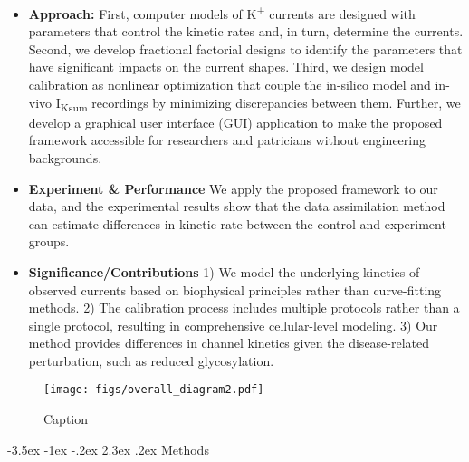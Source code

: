 \documentclass[11pt]{article}
\makeatletter
\renewcommand\section{\@startsection {section}{1}{\z@}%
                                   {-3.5ex \@plus -1ex \@minus -.2ex}%
                                   {2.3ex \@plus.2ex}%
                                   {\normalfont\fontfamily{phv}\fontsize{16}{19}\bfseries}}
\makeatother
\begin{document}
\begin{itemize}
    \item \textbf{Approach:} First, computer models of K\textsuperscript{+} currents are designed with parameters that control the kinetic rates and, in turn, determine the currents. Second, we develop fractional factorial designs to identify the parameters that have significant impacts on the current shapes. Third, we design model calibration as nonlinear optimization that couple the in-silico model and in-vivo I\textsubscript{Ksum} recordings by minimizing discrepancies between them. Further, we develop a graphical user interface (GUI) application to make the proposed framework accessible for researchers and patricians without engineering backgrounds.
    \item \textbf{Experiment \& Performance} We apply the proposed framework to our data, and the experimental results show that the data assimilation method can estimate differences in kinetic rate between the control and experiment groups.
    \item \textbf{Significance/Contributions} 1) We model the underlying kinetics of observed currents based on biophysical principles rather than curve-fitting methods. 2) The calibration process includes multiple protocols rather than a single protocol, resulting in comprehensive cellular-level modeling. 3) Our method provides differences in channel kinetics given the disease-related perturbation, such as reduced glycosylation. 
\end{itemize}

\begin{figure}
    \centering
    \texttt{[image: figs/overall\_diagram2.pdf]}
    \caption{Caption}
    \label{fig:framework_diagram}
\end{figure}

\section{Methods} \label{s:methods}
\end{document}

